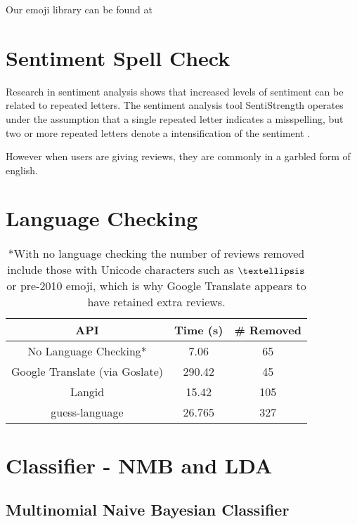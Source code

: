\documentclass{acm_proc_article-sp}
\begin{document}
 
 
 Our emoji library can be found at 
 



\section{Sentiment Spell Check}

Research in sentiment analysis  shows that increased levels of sentiment can be related to repeated letters.
The sentiment analysis tool SentiStrength operates under the assumption that a single repeated letter indicates a misspelling, but two or more repeated letters denote a intensification of the sentiment .

However when users are giving reviews, they are commonly in a garbled form of english.

\section{Language Checking}

\begin{table}
	

\begin{tabular}{|c | c | c|} \hline
	API & Time (s) &  \# Removed \\ \hline
	No Language Checking* & 7.06 & 65  \\
	Google Translate (via Goslate) & 290.42 & 45 \\
	Langid & 15.42 & 105 \\
	guess-language & 26.765 & 327    \\ \hline
	
\end{tabular}
\caption{ *With no language checking the number of reviews removed include those with Unicode characters such as $\textellipsis$ or pre-2010 emoji, which is why Google Translate appears to have retained extra reviews. }
\end{table}

\section{Classifier - NMB and LDA}


\subsection{Multinomial Naive Bayesian Classifier}
\end{document}
